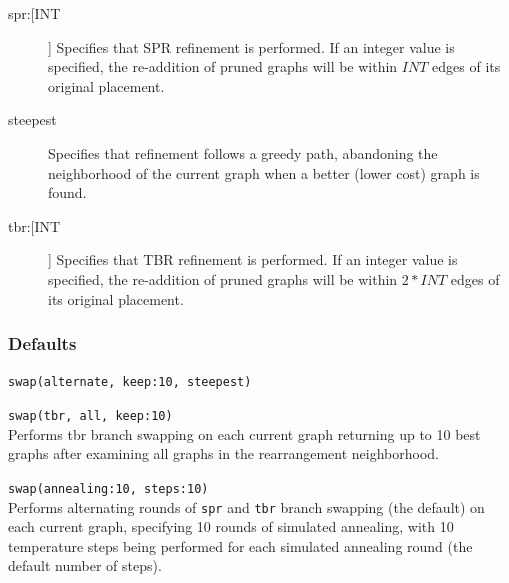 \begin{description}
		
		\item[spr:[INT]] Specifies that SPR refinement \citep{Dayhoff1969} is performed. If an 
		integer value is specified, the re-addition of pruned graphs will be within $INT$ 
		edges of its original placement.
		
		\item[steepest] Specifies that refinement follows a greedy path, abandoning the 
		neighborhood of the current graph when a better (lower cost) graph is found.  		
		
		\item[tbr:[INT]] Specifies that TBR refinement \citep{Farris1988, swofford1990a} 
		is performed. If an integer value is specified, the re-addition of pruned graphs 
		will be within $2 * INT$ edges of its original placement.
		
	\end{description}	
		
		\subsubsection{Defaults}
			\texttt{swap(alternate, keep:10, steepest)}
		
		\begin{example}
		
			\item{\texttt{swap(tbr, all, keep:10)}\\Performs tbr branch swapping on each current graph 
			returning up to 10 best graphs after examining all graphs in 
			the rearrangement neighborhood.}
			
			\item{\texttt{swap(annealing:10, steps:10)}\\Performs alternating rounds of \texttt{spr} and 
			\texttt{tbr} branch swapping (the default) on each current graph, specifying 10 rounds of
			simulated annealing, with 10 temperature steps being performed for each
			simulated annealing round (the default number of steps).}
			
		\end{example}
	
